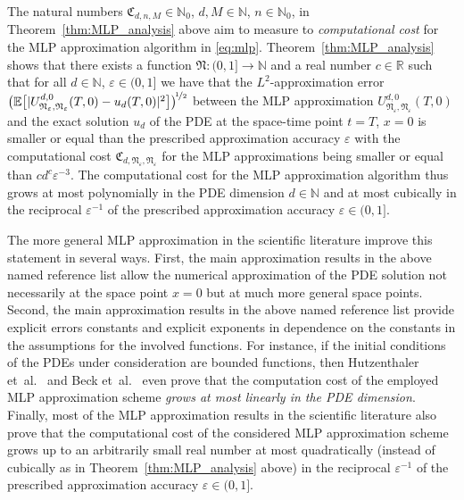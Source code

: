 \documentclass[12pt,AutoFakeBold,AutoFakeSlant]{article}
\theoremstyle{definition}
\newcommand{\R}{\mathbb{R}}
\newcommand{\E}{\mathbb{E}}
\newcommand{\N}{\mathbb{N}}
\begin{document}
	The natural numbers 
	$ \mathfrak{C}_{ d, n, M } \in \N_0 $, 
	$ d, M \in \N $, 
	$ n \in \N_0 $,
	in Theorem~\ref{thm:MLP_analysis} above 
	aim to measure to 
	\emph{computational cost} 
	for the MLP approximation algorithm in \eqref{eq:mlp}. 
	Theorem~\ref{thm:MLP_analysis} shows that 
	there exists a function 
	$ \mathfrak{N} \colon (0,1] \to \N $ 
	and a real number $ c \in \R $ 
	such that for all 
	$ d \in \N $, $ \varepsilon \in (0,1] $ 
	we have that 
	the $ L^2 $-approximation error 
	$
	\big(  
		\E\big[ 
		|
			U^{d,0}_{\mathfrak{N}_{\varepsilon},\mathfrak{N}_{\varepsilon}}(T,0)
			- 
			u_d(T,0)
		|^2
		\big]
	\big)^{\!\nicefrac12} 
	$
	between the MLP approximation 
	$
	U^{d,0}_{\mathfrak{N}_{\varepsilon},\mathfrak{N}_{\varepsilon}}(T,0)
	$
	and the exact solution 
	$ u_d $
	of the PDE 
	at the space-time point 
	$ t = T $, $ x = 0 $
	is smaller or equal than the 
	prescribed approximation 
	accuracy $ \varepsilon $ 
	with the computational cost 
	$
	\mathfrak{C}_{d,\mathfrak{N}_{\varepsilon},\mathfrak{N}_{\varepsilon}} 
	$
	for the MLP approximations 
	being smaller or equal than 
	$
	c d^c \varepsilon^{ - 3 }
	$. 
	The computational cost 
	for the MLP approximation algorithm
	thus grows at most polynomially 
	in the PDE dimension $ d \in \N $ 
	and at most cubically 
	in the reciprocal $ \varepsilon^{ - 1 } $ 
	of the prescribed approximation accuracy 
	$ \varepsilon \in (0,1] $. 



	The more general MLP approximation
	\cite{Becketal2019MLP_nonlip_arXiv,
	Hutzenthaleretal2018arXiv,
	hutzenthaler2019arxiv1903,
	giles2019generalised,
	hutzenthaler2019arxiv1912,
	hutzenthaler2020lipschitz}
	in the scientific literature 
	improve this statement in several ways. 
	First, the main approximation results in the above named reference list 
	allow the numerical approximation of the PDE solution not 
	necessarily at the space point $ x = 0 $ 
	but at much more general space points. 
	Second, the main approximation results in the above named reference list
	provide explicit errors constants and explicit exponents in dependence on the constants in 
	the assumptions for the involved functions. 
	For instance, if the initial conditions 
	of the PDEs under consideration are bounded functions, then 
	Hutzenthaler et~al.~\cite[Theorem~1.1]{Hutzenthaleretal2018arXiv} and 
	Beck et~al.~\cite[Theorem~1.1]{Becketal2019MLP_nonlip_arXiv} 
	even prove that the computation cost of the employed MLP approximation scheme 
	\emph{grows at most linearly in the PDE dimension}. 
	Finally, most of the MLP approximation results in the scientific literature also prove 
	that the computational cost of the considered MLP approximation scheme 
	grows up to an arbitrarily small real number 
	at most quadratically (instead of cubically as in Theorem~\ref{thm:MLP_analysis} above) 
	in the reciprocal $ \varepsilon^{ - 1 } $
	of the prescribed approximation accuracy 
	$ \varepsilon \in (0,1] $. 
\end{document}
